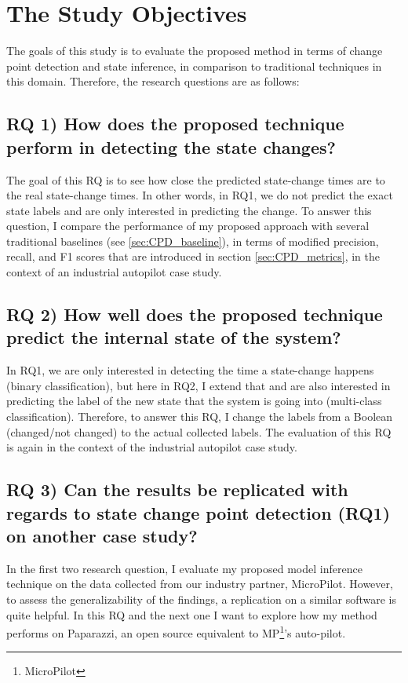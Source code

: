 \section{The Study Objectives}
The goals of this study is to evaluate the proposed method in terms of change point detection and state inference, in comparison to traditional techniques in this domain. Therefore, the research questions are as follows:

\subsection{RQ 1) How does the proposed technique perform in detecting the state changes?}
The goal of this RQ is to see how close the predicted state-change times are to the real state-change times. In other words, in RQ1, we do not predict the exact state labels and are only interested in predicting the change.
To answer this question, I compare the performance of my proposed approach with several traditional baselines (see \ref{sec:CPD_baseline}), in terms of modified precision, recall, and F1 scores that are introduced in section \ref{sec:CPD_metrics}, in the context of an industrial autopilot case study.


\subsection{RQ 2) How well does the proposed technique predict the internal state of the system?}
In RQ1, we are only interested in detecting the time a state-change happens (binary classification), but here in RQ2, I extend that and are also interested in predicting the label of the new state that the system is going into (multi-class classification).  
Therefore, to answer this RQ, I change the labels from a Boolean (changed/not changed) to the actual collected labels. The evaluation of this RQ is again in the context of the industrial autopilot case study.

\subsection{RQ 3) Can the results be replicated with regards to state change point detection (RQ1) on another case study?}
In the first two research question, I evaluate my proposed model inference technique on the data collected from our industry partner, MicroPilot. However, to assess the generalizability of the findings, a replication on a similar software is quite helpful. 
In this RQ and the next one I want to explore how my method performs on Paparazzi, an open source equivalent to MP\footnote{MicroPilot}'s auto-pilot.

